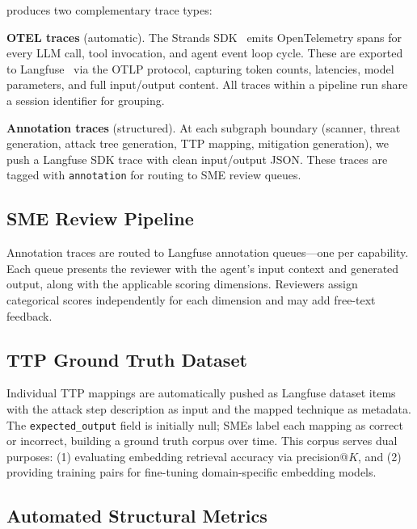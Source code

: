 \threatforest{} produces two complementary trace types:

\textbf{OTEL traces} (automatic). The Strands SDK~\cite{strands2025} emits OpenTelemetry spans for every LLM call, tool invocation, and agent event loop cycle. These are exported to Langfuse~\cite{langfuse2024} via the OTLP protocol, capturing token counts, latencies, model parameters, and full input/output content. All traces within a pipeline run share a session identifier for grouping.

\textbf{Annotation traces} (structured). At each subgraph boundary (scanner, threat generation, attack tree generation, TTP mapping, mitigation generation), we push a Langfuse SDK trace with clean input/output JSON. These traces are tagged with \texttt{annotation} for routing to SME review queues.

\subsection{SME Review Pipeline}

Annotation traces are routed to Langfuse annotation queues---one per capability. Each queue presents the reviewer with the agent's input context and generated output, along with the applicable scoring dimensions. Reviewers assign categorical scores independently for each dimension and may add free-text feedback.

\subsection{TTP Ground Truth Dataset}

Individual TTP mappings are automatically pushed as Langfuse dataset items with the attack step description as input and the mapped technique as metadata. The \texttt{expected\_output} field is initially null; SMEs label each mapping as correct or incorrect, building a ground truth corpus over time. This corpus serves dual purposes: (1) evaluating embedding retrieval accuracy via precision@$K$, and (2) providing training pairs for fine-tuning domain-specific embedding models.

\subsection{Automated Structural Metrics}

